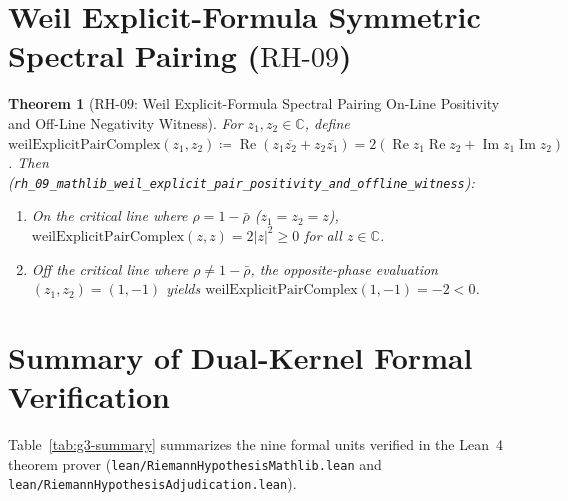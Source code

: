 \documentclass[11pt,a4paper]{article}
\theoremstyle{plain}
\newtheorem{theorem}{Theorem}[section]
\theoremstyle{definition}
\theoremstyle{remark}
\newcommand{\C}{\mathbb{C}}
\DeclareMathOperator{\RePart}{Re}
\DeclareMathOperator{\ImPart}{Im}
\begin{document}
\section{Weil Explicit-Formula Symmetric Spectral Pairing (\texorpdfstring{$\mathrm{RH\text{-}09}$}{RH-09})}\label{sec:rh09}

\begin{theorem}[$\mathrm{RH\text{-}09}$: Weil Explicit-Formula Spectral Pairing On-Line Positivity and Off-Line Negativity Witness]\label{thm:rh09}
For $z_1, z_2 \in \C$, define $\mathrm{weilExplicitPairComplex}(z_1, z_2) \coloneqq \RePart(z_1 \overline{z_2} + z_2 \overline{z_1}) = 2(\RePart z_1 \RePart z_2 + \ImPart z_1 \ImPart z_2)$. Then (\texttt{rh\_09\_mathlib\_weil\_explicit\_pair\_positivity\_and\_offline\_witness}):
\begin{enumerate}
  \item On the critical line where $\rho = 1 - \bar{\rho}$ ($z_1 = z_2 = z$), $\mathrm{weilExplicitPairComplex}(z, z) = 2|z|^2 \ge 0$ for all $z \in \C$.
  \item Off the critical line where $\rho \ne 1 - \bar{\rho}$, the opposite-phase evaluation $(z_1, z_2) = (1, -1)$ yields $\mathrm{weilExplicitPairComplex}(1, -1) = -2 < 0$.
\end{enumerate}
\end{theorem}

\section{Summary of Dual-Kernel Formal Verification}

Table~\ref{tab:g3-summary} summarizes the nine formal units verified in the Lean~4 theorem prover (\texttt{lean/RiemannHypothesisMathlib.lean} and \texttt{lean/RiemannHypothesisAdjudication.lean}).
\end{document}

